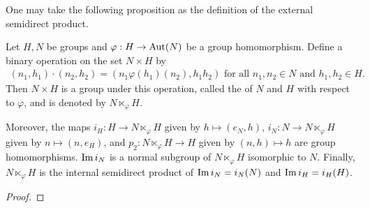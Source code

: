 One may take the following proposition as the definition of the external semidirect product.

\begin{proposition}
    Let $H,N$ be groups and $\varphi:H \to \operatorname{Aut}(N)$ be a group homomorphism. Define a binary operation on the set $N \times H$ by
    \begin{align}
        (n_{1},h_{1}) \cdot (n_{2},h_{2}) = (n_{1}\varphi(h_{1})(n_{2}),h_{1}h_{2}) \text{ for all } n_{1},n_{2} \in N \text{ and } h_{1},h_{2} \in H.
    \end{align}
    Then $N \times H$ is a group under this operation, called the  of $N$ and $H$ with respect to $\varphi$, and is denoted by $N \ltimes_{\varphi} H$.

    Moreover, the maps $i_{H}:H \to N \ltimes_{\varphi} H$ given by $h \mapsto (e_{N},h)$, $i_{N}:N \to N \ltimes_{\varphi} H$ given by $n \mapsto (n,e_{H})$, and $p_{2}:N \ltimes_{\varphi} H \to H$ given by $(n,h) \mapsto h$ are group homomorphisms. $\operatorname{Im} i_{N}$ is a normal subgroup of $N \ltimes_{\varphi} H$ isomorphic to $N$. Finally, $N \ltimes_{\varphi} H$ is the internal semidirect product of $\operatorname{Im} i_{N} = i_{N}(N)$ and $\operatorname{Im} i_{H} = i_{H}(H)$.
\end{proposition}
\begin{proof}
    
\end{proof}